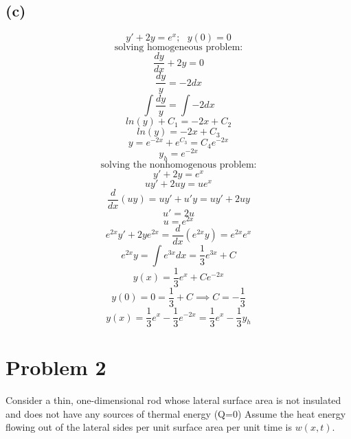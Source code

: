 \documentclass[preview,12pt]{article}
\begin{document}
    \subsection*{(c)}
        $$y'+2y=e^x;\textrm{ }y(0)=0$$
        $$\textrm{solving homogeneous problem:}$$
        $$\frac{dy}{dx}+2y=0$$
        $$\frac{dy}{y}=-2dx$$
        $$\int \frac{dy}{y}=\int -2dx$$
        $$ln(y)+C_1=-2x+C_2$$
        $$ln(y)=-2x+C_3$$
        $$y=e^{-2x}+e^{C_3}=C_4e^{-2x}$$
        $$y_h=e^{-2x}$$
        $$\textrm{solving the nonhomogenous problem:}$$
        $$y'+2y=e^x$$
        $$uy'+2uy=ue^x$$
        $$\frac{d}{dx}(uy)=uy'+u'y=uy'+2uy$$
        $$u'=2u$$
        $$u=e^{2x}$$
        $$e^{2x}y'+2ye^{2x}=\frac{d}{dx}(e^{2x}y)=e^{2x}e^x$$
        $$e^{2x}y=\int e^{3x} dx = \frac{1}{3}e^{3x}+C$$
        $$y(x)=\frac{1}{3}e^x+Ce^{-2x}$$
        $$y(0)=0=\frac{1}{3}+C \implies C=-\frac{1}{3}$$
        $$y(x)=\frac{1}{3}e^x-\frac{1}{3}e^{-2x}=\frac{1}{3}e^x-\frac{1}{3}y_h$$
    
    \section*{Problem 2}
        Consider a thin, one-dimensional rod whose lateral surface area is not insulated and does not have any sources of thermal energy (Q=0)  Assume the heat energy flowing out of the lateral sides per unit surface area per unit time is $w(x,t)$.
\end{document}
